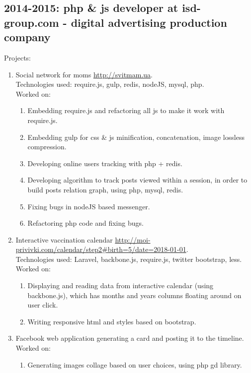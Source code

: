 \documentclass[a4paper, 14pt]{article}
\begin{document}
	\subsection{2014-2015: php \& js developer at isd-group.com - digital advertising production company}
    Projects:
    \begin{enumerate}
        \item Social network for moms \url{http://svitmam.ua}. \\
            Technologies used: require.js, gulp, redis, nodeJS, mysql, php. \\
            Worked on: 
            \begin{enumerate}
                \item Embedding require.js and refactoring all js to make it work with require.js.
                \item Embedding gulp for css \& js minification, concatenation, image lossless compression. 
                \item Developing online users tracking with php + redis.
                \item Developing algorithm to track posts viewed within a session, in order to build posts relation graph, using php, mysql, redis.
                \item Fixing bugs in nodeJS based messenger.
                \item Refactoring php code and fixing bugs.
            \end{enumerate}
        \item Interactive vaccination calendar \url{http://moi-privivki.com/calendar/step2#birth=5/date=2018-01-01}. \\
            Technologies used: Laravel, backbone.js, require.js, twitter bootstrap, less. \\
            Worked on:
            \begin{enumerate}
                \item Displaying and reading data from interactive calendar (using backbone.js), which has months and years columns floating around on user click.
                \item Writing responsive html and styles based on bootstrap.
            \end{enumerate}
        \item Facebook web application generating a card and posting it to the timeline.
            Worked on:
            \begin{enumerate}
                \item Generating images collage based on user choices, using php gd library.

\end{enumerate}
\end{enumerate}
\end{document}
